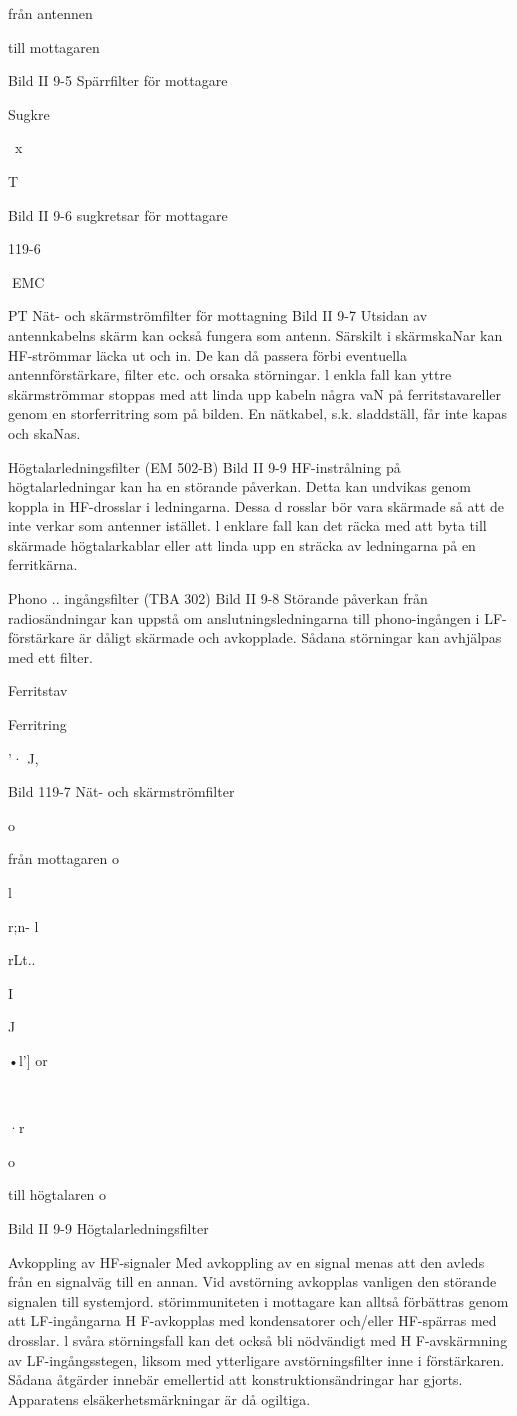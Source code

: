 \documentclass[a4paper,twoside,twocolumn,openright]{book}
\begin{document}
{{{{{från
antennen

till
mottagaren

Bild II 9-5 Spärrfilter för mottagare

Sugkre~

~x

T

Bild II 9-6 sugkretsar för mottagare

119-6

EMC

PT
Nät- och skärmströmfilter för mottagning
Bild II 9-7
Utsidan av antennkabelns skärm kan också
fungera som antenn. Särskilt i skärmskaNar
kan HF-strömmar läcka ut och in. De kan då
passera förbi eventuella antennförstärkare,
filter etc. och orsaka störningar.
l enkla fall kan yttre skärmströmmar stoppas med att linda upp kabeln några vaN på
ferritstavareller genom en storferritring som
på bilden. En nätkabel, s.k. sladdställ, får
inte kapas och skaNas.

Högtalarledningsfilter (EM 502-B)
Bild II 9-9
HF-instrålning på högtalarledningar kan ha
en störande påverkan. Detta kan undvikas
genom koppla in HF-drosslar i ledningarna.
Dessa d rosslar bör vara skärmade så att de
inte verkar som antenner istället.
l enklare fall kan det räcka med att byta till
skärmade högtalarkablar eller att linda upp
en sträcka av ledningarna på en ferritkärna.

Phono .. ingångsfilter (TBA 302)
Bild II 9-8
Störande påverkan från radiosändningar kan
uppstå om anslutningsledningarna till phono-ingången i LF-förstärkare är dåligt skärmade och avkopplade. Sådana störningar
kan avhjälpas med ett filter.

Ferritstav

Ferritring

'·
J,

Bild 119-7 Nät- och skärmströmfilter

o

från
mottagaren
o

l

r;n- l

rLt..

I

J

•l']
or

~

·r

o

till
högtalaren
o

Bild II 9-9 Högtalarledningsfilter

Avkoppling av HF-signaler
Med avkoppling av en signal menas att
den avleds från en signalväg till en
annan. Vid avstörning avkopplas vanligen den störande signalen till systemjord.
störimmuniteten i mottagare kan
alltså förbättras genom att LF-ingångarna H F-avkopplas med kondensatorer
och/eller HF-spärras med drosslar.
l svåra störningsfall kan det också
bli nödvändigt med H F-avskärmning av
LF-ingångsstegen, liksom med ytterligare avstörningsfilter inne i förstärkaren.
Sådana åtgärder innebär emellertid
att konstruktionsändringar har gjorts.
Apparatens elsäkerhetsmärkningar är
då ogiltiga.

}}}}}
\end{document}
